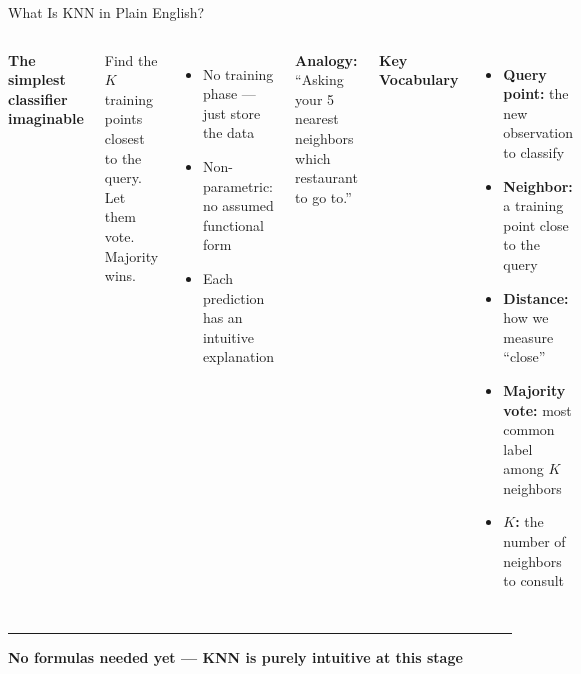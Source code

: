 \documentclass[8pt,aspectratio=169]{beamer}
\newcommand{\bottomnote}[1]{%
\vfill
\vspace{-2mm}
\textcolor{mllavender2}{\rule{\textwidth}{0.4pt}}
\vspace{1mm}
\footnotesize
\textbf{#1}
}
\newenvironment{compactlist}{%
  \begin{itemize}%
    \setlength{\itemsep}{2pt}%
    \setlength{\parskip}{0pt}%
    \setlength{\parsep}{0pt}%
}{%
  \end{itemize}%
}
\newcommand{\highlight}[1]{\textcolor{mlorange}{\textbf{#1}}}
\begin{document}
\begin{frame}[t]{What Is KNN in Plain English?}
\begin{columns}[T]
\small
\textbf{The simplest classifier imaginable}

\footnotesize
Find the $K$ training points closest to the query. Let them vote. Majority wins.
\begin{compactlist}
\item \footnotesize No training phase --- just store the data
\item \footnotesize Non-parametric: no assumed functional form
\item \footnotesize Each prediction has an intuitive explanation
\end{compactlist}

\vspace{2mm}
\highlight{Analogy:} ``Asking your 5 nearest neighbors which restaurant to go to.''

\vspace{2mm}
\footnotesize
\textbf{Key Vocabulary}
\begin{compactlist}
\item \footnotesize \textbf{Query point:} the new observation to classify
\item \footnotesize \textbf{Neighbor:} a training point close to the query
\item \footnotesize \textbf{Distance:} how we measure ``close''
\item \footnotesize \textbf{Majority vote:} most common label among $K$ neighbors
\item \footnotesize \textbf{$K$:} the number of neighbors to consult
\end{compactlist}
\end{columns}
\bottomnote{No formulas needed yet --- KNN is purely intuitive at this stage}
\end{frame}
\end{document}
